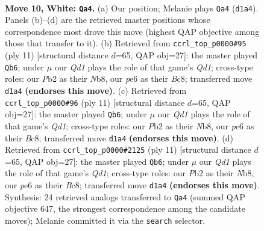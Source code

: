 \documentclass[11pt]{article}
\begin{document}
\clearpage

\begin{figure}[p]\centering
\begin{subfigure}{0.46\textwidth}\centering
\resizebox{\linewidth}{!}{%
\newchessgame
\chessboard[
  setfen={r1b2r2/ppppqppk/2n1pn2/7p/2PP4/2B2NP1/PP2PP1P/R2QKB1R w - - 4 10},
  showmover=false,
  pgfstyle=straightmove, color=movearrow, markmove={d1-a4}
]}
\caption{}
\end{subfigure}\hfill
\begin{subfigure}{0.46\textwidth}\centering
\resizebox{\linewidth}{!}{%
\newchessgame
\chessboard[
  setfen={rnbqkb1r/1p2pppp/p2p1n2/8/3NP3/2N2P2/PPP3PP/R1BQKB1R b KQkq - 0 6},
  showmover=false,
  pgfstyle=straightmove, color=movearrow, markmove={d8-b6}
]}
\caption{}
\end{subfigure}
\\[4pt]
\begin{subfigure}{0.46\textwidth}\centering
\resizebox{\linewidth}{!}{%
\newchessgame
\chessboard[
  setfen={rnbqkb1r/1p2pppp/p2p1n2/8/3NP3/2N2P2/PPP3PP/R1BQKB1R b KQkq - 0 6},
  showmover=false,
  pgfstyle=straightmove, color=movearrow, markmove={d8-b6}
]}
\caption{}
\end{subfigure}\hfill
\begin{subfigure}{0.46\textwidth}\centering
\resizebox{\linewidth}{!}{%
\newchessgame
\chessboard[
  setfen={rnbqkb1r/1p2pppp/p2p1n2/8/3NP3/2N2P2/PPP3PP/R1BQKB1R b KQkq - 0 6},
  showmover=false,
  pgfstyle=straightmove, color=movearrow, markmove={d8-b6}
]}
\caption{}
\end{subfigure}
\caption{\textbf{Move 10, White: \texttt{Qa4}.} (a) Our position; Melanie plays \texttt{Qa4} (\texttt{d1a4}). Panels (b)--(d) are the retrieved master positions whose correspondence most drove this move (highest QAP objective among those that transfer to it). (b) Retrieved from \texttt{ccrl\_top\_p0000\#95} (ply 11) [structural distance $d$=65, QAP obj=27]: the master played \texttt{Qb6}; under $\mu$ our \emph{Qd1} plays the role of that game's \emph{Qd1}; cross-type roles: our \emph{P}b2 as their \emph{N}b8, our \emph{p}e6 as their \emph{B}c8; transferred move \texttt{d1a4} \textbf{(endorses this move)}. (c) Retrieved from \texttt{ccrl\_top\_p0000\#96} (ply 11) [structural distance $d$=65, QAP obj=27]: the master played \texttt{Qb6}; under $\mu$ our \emph{Qd1} plays the role of that game's \emph{Qd1}; cross-type roles: our \emph{P}b2 as their \emph{N}b8, our \emph{p}e6 as their \emph{B}c8; transferred move \texttt{d1a4} \textbf{(endorses this move)}. (d) Retrieved from \texttt{ccrl\_top\_p0000\#2125} (ply 11) [structural distance $d$=65, QAP obj=27]: the master played \texttt{Qb6}; under $\mu$ our \emph{Qd1} plays the role of that game's \emph{Qd1}; cross-type roles: our \emph{P}b2 as their \emph{N}b8, our \emph{p}e6 as their \emph{B}c8; transferred move \texttt{d1a4} \textbf{(endorses this move)}. Synthesis: 24 retrieved analogs transferred to \texttt{Qa4} (summed QAP objective 647, the strongest correspondence among the candidate moves); Melanie committed it via the \texttt{search} selector.}
\label{fig:thought-m18}
\end{figure}
\end{document}
